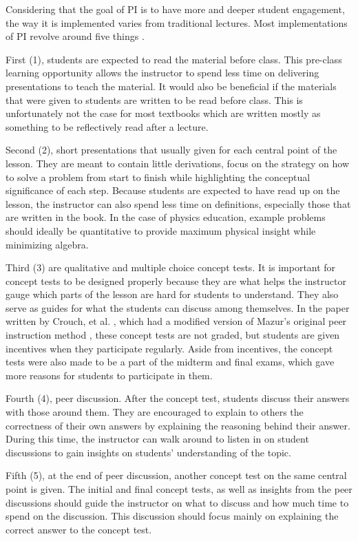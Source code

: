 Considering that the goal of PI is to have more and deeper student engagement, the way it is implemented varies from traditional lectures.
Most implementations of PI revolve around five things \cite{crouch2001peer,mazur1999}.

First (1), students are expected to read the material before class.
This pre-class learning opportunity allows the instructor to spend less time on delivering presentations to teach the material.
It would also be beneficial if the materials that were given to students are written to be read before class.
This is unfortunately not the case for most textbooks which are written mostly as something to be reflectively read after a lecture.

Second (2), short presentations that usually given for each central point of the lesson.
They are meant to contain little derivations, focus on the strategy on how to solve a problem from start to finish while highlighting the conceptual significance of each step.
Because students are expected to have read up on the lesson, the instructor can also spend less time on definitions, especially those that are written in the book.
In the case of physics education, example problems should ideally be quantitative to provide maximum physical insight while minimizing algebra.

Third (3) are qualitative and multiple choice concept tests. 
It is important for concept tests to be designed properly because they are what helps the instructor gauge which parts of the lesson are hard for students to understand.
They also serve as guides for what the students can discuss among themselves.
In the paper written by Crouch, et al. \cite{crouch2001peer}, which had a modified version of Mazur's original peer instruction method \cite{mazur1999}, these concept tests are not graded, but students are given incentives when they participate regularly.
Aside from incentives, the concept tests were also made to be a part of the midterm and final exams, which gave more reasons for students to participate in them.

Fourth (4), peer discussion.
After the concept test, students discuss their answers with those around them.
They are encouraged to explain to others the correctness of their own answers by explaining the reasoning behind their answer.
During this time, the instructor can walk around to listen in on student discussions to gain insights on students' understanding of the topic.

Fifth (5), at the end of peer discussion, another concept test on the same central point is given.
The initial and final concept tests, as well as insights from the peer discussions should guide the instructor on what to discuss and how much time to spend on the discussion.
This discussion should focus mainly on explaining the correct answer to the concept test.


